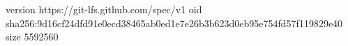 version https://git-lfs.github.com/spec/v1
oid sha256:9d16cf24dfd91e0ecd38465ab0ed1e7e26b3b623d0eb95e754fd57f119829e40
size 5592560
